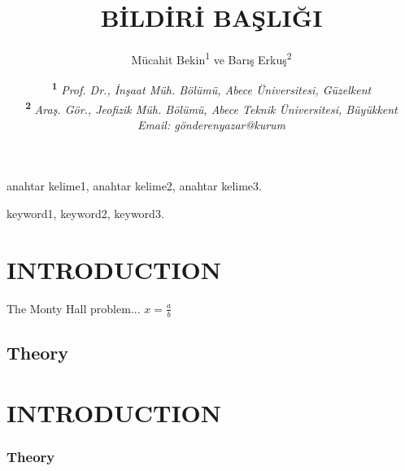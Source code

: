 \documentclass[turkish]{eqconf}
\title{BİLDİRİ BAŞLIĞI}
\author{%
		Mücahit Bekin\textsuperscript{1} ve
		Barış Erkuş\textsuperscript{2}%
}
\date{\small%
\textsuperscript{\textbf{1}}
\textit{Prof. Dr., İnşaat Müh. Bölümü, Abece Üniversitesi, Güzelkent}\\
\textsuperscript{\textbf{2}}
\textit{Araş. Gör., Jeofizik Müh. Bölümü, Abece Teknik Üniversitesi, 
Büyükkent}\\
\textit{Email: gönderenyazar@kurum}%
}
\begin{document}
\fixturkishbug
\maketitle
\thispagestyle{firststyle}

 
\begin{ozet}
\blindtext
\end{ozet}

\begin{anahtarkelimeler}
anahtar kelime1, anahtar kelime2, anahtar kelime3.
\end{anahtarkelimeler}


\begin{abstract} 
\blindtext
\end{abstract}

\begin{keywords}
keyword1, keyword2, keyword3.
\end{keywords}



 
\section{INTRODUCTION}
The Monty Hall problem...
$x=\frac{a}{b}$
 
\subsection{Theory}

\blindtext

\section{INTRODUCTION}

\blindtext

\subsubsection*{Theory}

\blindtext

\blindtext

\blindtext

\blindtext

\blindtext
\end{document}
